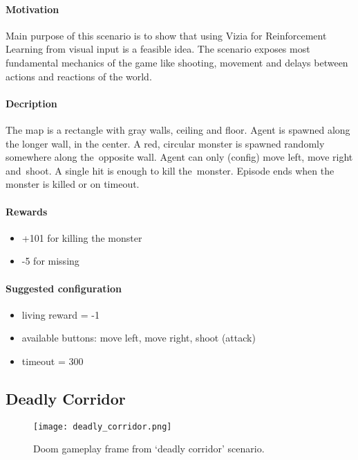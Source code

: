 		\paragraph{Motivation}
			Main purpose of this scenario is to show that using Vizia for Reinforcement Learning from visual input is a feasible idea. The scenario exposes most fundamental mechanics of the game like shooting, movement and delays between actions and reactions of the world.
		
		\paragraph{Decription}
			The map is a rectangle with gray walls, ceiling and floor. Agent is spawned along the longer wall, in the center. A red, circular monster is spawned randomly somewhere along the~opposite wall. Agent can only (config) move left, move right and~shoot. A single hit is enough to kill the~monster. Episode ends when the monster is killed or on timeout.
		
		\paragraph{Rewards}
			\begin{itemize}
				\item +101 for killing the monster
				\item -5 for missing
			\end{itemize}
		
		\paragraph{Suggested configuration}
			\begin{itemize}
				\item living reward = -1
				\item available buttons: move left, move right, shoot (attack)
				\item timeout = 300
			\end{itemize}
	\newpage

	\subsection{Deadly Corridor}
		\begin{figure}
			\centering
			\texttt{[image: deadly\_corridor.png]}
			\caption{Doom gameplay frame from `deadly corridor' scenario.}\label{fig:deadly_corridor}
		\end{figure}

